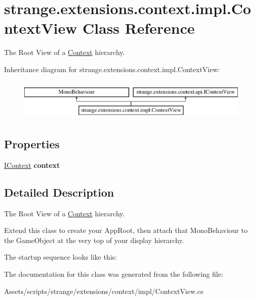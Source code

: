 \hypertarget{classstrange_1_1extensions_1_1context_1_1impl_1_1_context_view}{\section{strange.\-extensions.\-context.\-impl.\-Context\-View Class Reference}
\label{classstrange_1_1extensions_1_1context_1_1impl_1_1_context_view}
}


The Root View of a \hyperlink{classstrange_1_1extensions_1_1context_1_1impl_1_1_context}{Context} hierarchy.  


Inheritance diagram for strange.\-extensions.\-context.\-impl.\-Context\-View\-:\begin{figure}[H]
\begin{center}
\leavevmode
\includegraphics[height=2.000000cm]{classstrange_1_1extensions_1_1context_1_1impl_1_1_context_view}
\end{center}
\end{figure}
\subsection*{Properties}
\begin{DoxyCompactItemize}
\item 
\hypertarget{classstrange_1_1extensions_1_1context_1_1impl_1_1_context_view_ae5bb756aecf7d6e310642b43f2a2af6c}{\hyperlink{interfacestrange_1_1extensions_1_1context_1_1api_1_1_i_context}{I\-Context} {\bfseries context}}\label{classstrange_1_1extensions_1_1context_1_1impl_1_1_context_view_ae5bb756aecf7d6e310642b43f2a2af6c}

\end{DoxyCompactItemize}


\subsection{Detailed Description}
The Root View of a \hyperlink{classstrange_1_1extensions_1_1context_1_1impl_1_1_context}{Context} hierarchy. 

Extend this class to create your App\-Root, then attach that Mono\-Behaviour to the Game\-Object at the very top of your display hierarchy.

The startup sequence looks like this\-: \begin{DoxyVerb}void Awake()
{
    context = new MyContext(this, true);
    context.Start ();
\end{DoxyVerb}
 

The documentation for this class was generated from the following file\-:\begin{DoxyCompactItemize}
\item 
Assets/scripts/strange/extensions/context/impl/Context\-View.\-cs\end{DoxyCompactItemize}
